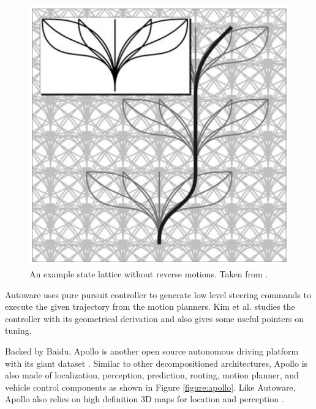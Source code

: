 \begin{figure}[h]
  \centering
  \includegraphics[width=.8\textwidth]{figures/state-lattice.png}
  \caption[An example state lattice]{An example state lattice without reverse
    motions. Taken from \cite{Pivtoraiko2009DifferentiallyCM}.}
  \label{figure:state-lattice}
\end{figure}

Autoware uses pure pursuit controller to generate low level steering commands
to execute the given trajectory from the motion planners. Kim et al.
\cite{Kim2013SensorbasedMP} studies the controller with its geometrical
derivation and also gives some useful pointers on tuning.

Backed by Baidu, Apollo is another open source autonomous driving platform with
its giant dataset \cite{Huang2018TheAD}. Similar to other decompositioned
architectures, Apollo is also made of localization, perception, prediction,
routing, motion planner, and vehicle control components as shown in Figure
\ref{figure:apollo}. Like Autoware, Apollo also relies on high definition 3D
maps for location and perception \cite{Fan2018BaiduAE}.

